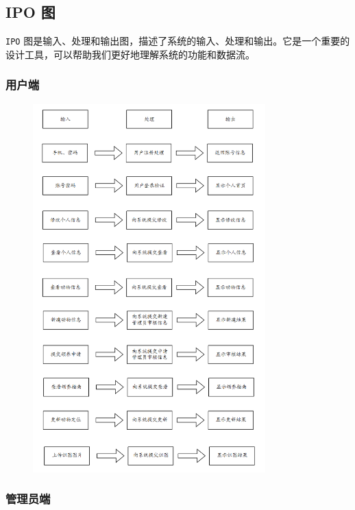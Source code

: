 \documentclass[12pt,a4paper,UTF8]{article}
\begin{document}
\subsection{IPO 图}

\verb|IPO| 图是输入、处理和输出图，描述了系统的输入、处理和输出。它是一个重要的设计工具，可以帮助我们更好地理解系统的功能和数据流。

\subsubsection{用户端}

\begin{figure}[H]
  \centering
  \includegraphics[width=0.8\textwidth]{figures/ipo1.png}
\end{figure}

\subsubsection{管理员端}
\end{document}
